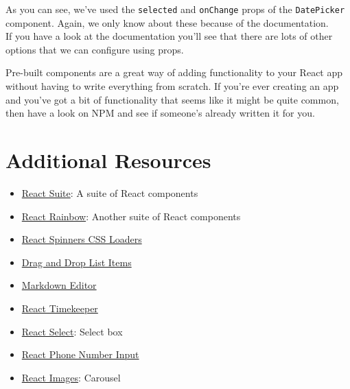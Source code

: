 \inputminted{js}{08-pre-built-components/figures/02-Dates.js}

As you can see, we've used the \texttt{selected} and \texttt{onChange} props of the \texttt{DatePicker} component. Again, we only know about these because of the documentation.
\\

If you have a look at the documentation you'll see that there are lots of other options that we can configure using props.

\hr

Pre-built components are a great way of adding functionality to your React app without having to write everything from scratch. If you're ever creating an app and you've got a bit of functionality that seems like it might be quite common, then have a look on NPM and see if someone's already written it for you.



\section{Additional Resources}

\begin{itemize}[leftmargin=*]
    \item \href{https://rsuitejs.com/en/}{React Suite}: A suite of React components
    \item \href{https://react-rainbow.web.app}{React Rainbow}: Another suite of React components
    \item \href{https://github.com/JoshK2/react-spinners-css}{React Spinners CSS Loaders}
    \item \href{https://github.com/atlassian/react-beautiful-dnd}{Drag and Drop List Items}
    \item \href{https://github.com/uiwjs/react-md-editor}{Markdown Editor}
    \item \href{https://catc.github.io/react-timekeeper/}{React Timekeeper}
    \item \href{https://react-select.com/home}{React Select}: Select box
    \item \href{https://github.com/catamphetamine/react-phone-number-input}{React Phone Number Input}
    \item \href{https://github.com/jossmac/react-images}{React Images}: Carousel
\end{itemize}
